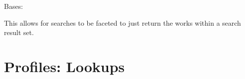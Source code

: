 \documentclass[letterpaper,10pt,english]{sphinxmanual}
\begin{document}
\begin{fulllineitems}
\label{generated/apps.profiles.handlers:apps.profiles.handlers.WorkResultHandler}
Bases: {\hyperref[generated/apps.profiles.handlers:apps.profiles.handlers.ResultHandler]{}}

This  allows for searches to be faceted to just return the works
within a search result set.


\begin{fulllineitems}
\label{generated/apps.profiles.handlers:apps.profiles.handlers.WorkResultHandler.read}
\end{fulllineitems}


\end{fulllineitems}



\chapter{Profiles: Lookups}
\label{generated/apps.profiles.lookups:profiles-lookups}\label{generated/apps.profiles.lookups:module-apps.profiles.lookups}\label{generated/apps.profiles.lookups::doc}
\end{document}
